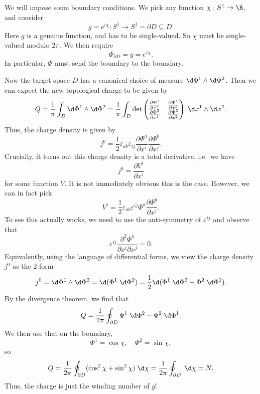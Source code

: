\documentclass[a4paper]{article}
\begin{document}
We will impose some boundary conditions. We pick any function $\chi: S^1 \to \R$, and consider
\[
  g = e^{i\chi}: S^1 \to S^1 = \partial D \subseteq D.
\]
Here $g$ is a genuine function, and has to be single-valued. So $\chi$ must be single-valued modulo $2\pi$. We then require
\[
  \Phi_{\partial D} = g = e^{i \chi}.
\]
In particular, $\Phi$ must send the boundary to the boundary.

Now the target space $D$ has a canonical choice of measure $\d \Phi^1 \wedge \d \Phi^2$. Then we can expect the new topological charge to be given by
\[
  Q = \frac{1}{\pi} \int_D \d \Phi^1 \wedge \d \Phi^2 = \frac{1}{\pi} \int_D \det
  \begin{pmatrix}
    \frac{\partial \Phi^1}{\partial x^1} & \frac{\partial \Phi^1}{\partial x^2}\\
    \frac{\partial \Phi^2}{\partial x^1} & \frac{\partial \Phi^2}{\partial x^2}
  \end{pmatrix}\;\d x^1 \wedge \d x^2.
\]
Thus, the charge density is given by
\[
  j^0 = \frac{1}{2} \varepsilon_{ab} \varepsilon_{ij} \frac{\partial \Phi^a}{\partial x^i} \frac{\partial \Phi^b}{\partial x^j}.
\]
Crucially, it turns out this charge density is a total derivative, i.e.\ we have
\[
  j^0 = \frac{\partial V^i}{\partial x^i}
\]
for some function $V$. It is not immediately obvious this is the case. However, we can in fact pick
\[
  V^i = \frac{1}{2} \varepsilon_{ab}\varepsilon^{ij} \Phi^a \frac{\partial \Phi^b}{\partial x^j}.
\]
To see this actually works, we need to use the anti-symmetry of $\varepsilon^{ij}$ and observe that
\[
  \varepsilon^{ij} \frac{\partial^2 \Phi^b}{\partial x^i \partial x^j} = 0.
\]
Equivalently, using the language of differential forms, we view the charge density $j^0$ as the $2$-form
\[
  j^0 = \d \Phi^1 \wedge \d \Phi^2 = \d (\Phi^1\;\d \Phi^2) = \frac{1}{2} \d (\Phi^1 \;\d \Phi^2 - \Phi^2 \;\d \Phi^1).
\]
By the divergence theorem, we find that
\[
  Q = \frac{1}{2\pi}\oint_{\partial D} \Phi^1 \;\d \Phi^2 - \Phi^2 \;\d \Phi^1.
\]
We then use that on the boundary,
\[
  \Phi^1 = \cos \chi,\quad \Phi^2 = \sin \chi,
\]
so
\[
  Q = \frac{1}{2\pi} \oint_{\partial D} (\cos^2 \chi + \sin^2 \chi) \;\d \chi = \frac{1}{2\pi} \oint_{\partial D} \;\d \chi = N.
\]
Thus, the charge is just the winding number of $g$!
\end{document}
